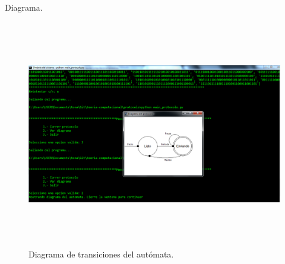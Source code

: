 	{\large Diagrama.}
	\begin{figure}[H]
		\begin{center}
			\includegraphics[width=\linewidth, height=10cm]{img/protocolo-diagrama.png}
			\caption{Diagrama de transiciones del autómata.}
			\label{fig:protocolo3}
		\end{center}
	\end{figure}